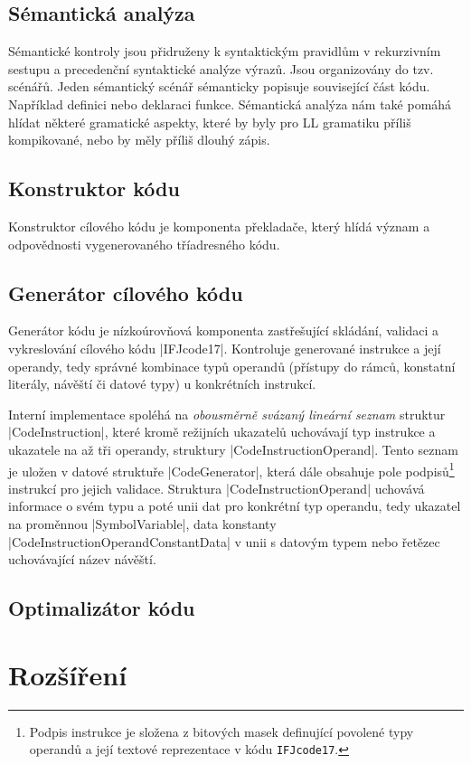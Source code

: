\subsection{Sémantická analýza}
Sémantické kontroly jsou přidruženy k syntaktickým pravidlům v rekurzivním sestupu a
precedenční syntaktické analýze výrazů. Jsou organizovány do tzv. scénářů. Jeden
sémantický scénář sémanticky popisuje související část kódu. Například definici
nebo deklaraci funkce. Sémantická analýza nám také pomáhá hlídat některé gramatické aspekty,
které by byly pro LL gramatiku příliš kompikované, nebo by měly příliš dlouhý zápis.


\subsection{Konstruktor kódu}
\label{subsec:code-constructor}
Konstruktor cílového kódu je komponenta překladače, který hlídá význam a odpovědnosti vygenerovaného tříadresného kódu.

\subsection{Generátor cílového kódu}
Generátor kódu je nízkoúrovňová komponenta zastřešující skládání, validaci a vykreslování cílového kódu \ic|IFJcode17|.
Kontroluje generované instrukce a její operandy, tedy správné kombinace typů operandů (přístupy do rámců, konstatní
literály, návěští či datové typy) u konkrétních instrukcí.

Interní implementace spoléhá na \emph{obousměrně svázaný lineární seznam} struktur \ic|CodeInstruction|, které kromě
režijních ukazatelů uchovávají typ instrukce a ukazatele na až tři operandy, struktury \ic|CodeInstructionOperand|.
Tento seznam je uložen v datové struktuře \ic|CodeGenerator|, která dále obsahuje pole podpisů\footnote{Podpis
instrukce je složena z bitových masek definující povolené typy operandů a její textové reprezentace v kódu
\texttt{IFJcode17}.} instrukcí pro jejich validace.
Struktura \ic|CodeInstructionOperand| uchovává informace o svém typu a poté unii dat pro konkrétní typ operandu, tedy
ukazatel na proměnnou \ic|SymbolVariable|,
data konstanty \ic|CodeInstructionOperandConstantData| v unii s datovým typem nebo řetězec uchovávající název návěští.
\subsection{Optimalizátor kódu}
\section{Rozšíření}

